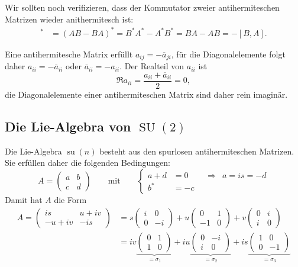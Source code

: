 Wir sollten noch verifizieren, dass der Kommutator zweier antihermiteschen
Matrizen wieder anithermitesch ist:
%
\begin{align*}
[A,B]^*
&=
(AB-BA)^*
=
B^*A^*-A^*B^*
=
BA - AB
=
-[B,A].
\end{align*}

Eine antihermitesche Matrix erfüllt $a_{i\!j}=-\overline{a}_{ji}$,
für die Diagonalelemente folgt daher $a_{ii} = -\overline{a}_{ii}$
oder $\overline{a}_{ii}=-a_{ii}$.
Der Realteil von $a_{ii}$ ist
\[
\Re a_{ii}
=
\frac{a_{ii}+\overline{a}_{ii}}2
=
0,
\]
die Diagonalelemente einer antihermiteschen Matrix sind daher rein
imaginär.


%
%
\subsection{Die Lie-Algebra von $\operatorname{SU}(2)$}
Die Lie-Algebra $\operatorname{su}(n)$ besteht aus den
spurlosen antihermiteschen Matrizen.
%
Sie erfüllen daher die folgenden Bedingungen:
\[
A=\begin{pmatrix}a&b\\c&d\end{pmatrix}
\qquad
\text{mit}
\qquad
\left\{
\begin{aligned}
a+d&=0&&\Rightarrow& a=is = -d
\\
b^*&=-c
\end{aligned}
\right.
\]
Damit hat $A$ die Form
\begin{align*}
A=\begin{pmatrix}
is&u+iv\\
-u+iv&-is
\end{pmatrix}
&=
s
\begin{pmatrix}
i&0\\
0&-i
\end{pmatrix}
+
u
\begin{pmatrix}
 0&1\\
-1&0
\end{pmatrix}
+
v
\begin{pmatrix}
0&i\\
i&0
\end{pmatrix}
\\
&=
iv\underbrace{\begin{pmatrix}0&1\\1&0\end{pmatrix}}_{\displaystyle=\sigma_1}
+
iu\underbrace{\begin{pmatrix}0&-i\\i&0\end{pmatrix}}_{\displaystyle=\sigma_2}
+
is\underbrace{\begin{pmatrix}1&0\\0&-1\end{pmatrix}}_{\displaystyle=\sigma_3}
\end{align*}
